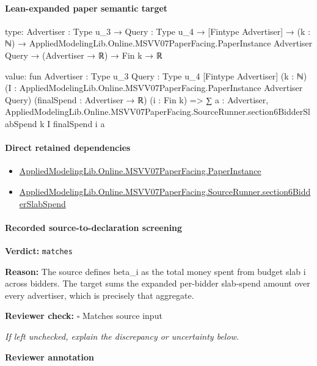 \documentclass[10pt]{article}
\newcommand{\reviewerbox}{%
  \par\noindent\fbox{\parbox{0.96\linewidth}{\rule{0pt}{0.38in}}}\par
}
\newcommand{\reviewmatch}[1]{%
  \par\noindent\textbf{Reviewer check:} $\square$\; #1\par
  \noindent\emph{If left unchecked, explain the discrepancy or uncertainty below.}\par
}
\begin{document}
\paragraph{Lean-expanded paper semantic target}
\begin{ReviewVerbatim}
type:
{Advertiser : Type u_3} →
  {Query : Type u_4} →
    [Fintype Advertiser] →
      (k : ℕ) →
        AppliedModelingLib.Online.MSVV07PaperFacing.PaperInstance Advertiser Query → (Advertiser → ℝ) → Fin k → ℝ

value:
fun {Advertiser : Type u_3} {Query : Type u_4} [Fintype Advertiser] (k : ℕ)
    (I : AppliedModelingLib.Online.MSVV07PaperFacing.PaperInstance Advertiser Query) (finalSpend : Advertiser → ℝ)
    (i : Fin k) =>
  ∑ a : Advertiser, AppliedModelingLib.Online.MSVV07PaperFacing.SourceRunner.section6BidderSlabSpend k I finalSpend i a
\end{ReviewVerbatim}

\paragraph{Direct retained dependencies}
\begin{itemize}\raggedright
\item \hyperlink{governing-declaration-11907576ec71eeb5}{Applied\allowbreak{}Modeling\allowbreak{}Lib.\allowbreak{}Online.\allowbreak{}MSVV07\allowbreak{}Paper\allowbreak{}Facing.\allowbreak{}Paper\allowbreak{}Instance}
\item \hyperlink{paper-prerequisite-282ef5d1a0c0f071}{Applied\allowbreak{}Modeling\allowbreak{}Lib.\allowbreak{}Online.\allowbreak{}MSVV07\allowbreak{}Paper\allowbreak{}Facing.\allowbreak{}Source\allowbreak{}Runner.\allowbreak{}section6\allowbreak{}Bidder\allowbreak{}Slab\allowbreak{}Spend}
\end{itemize}
\paragraph{Recorded source-to-declaration screening}
\textbf{Verdict:} \texttt{matches}
\\
{\raggedright
\textbf{Reason:} The source defines beta\_\allowbreak{}i as the total money spent from budget slab i across bidders.\allowbreak{} The target sums the expanded per-\allowbreak{}bidder slab-\allowbreak{}spend amount over every advertiser, which is precisely that aggregate.\allowbreak{}
\par}
\reviewmatch{Matches source input}
\noindent\textbf{Reviewer annotation}\par
\reviewerbox
\clearpage
\hypertarget{paper-prerequisite-6b36020b23d610d7}{}
\end{document}
